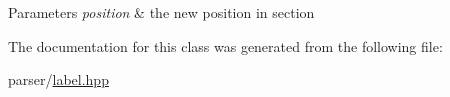 \begin{DoxyParams}{Parameters}
{\em position} & the new position in section \\
\hline
\end{DoxyParams}


The documentation for this class was generated from the following file\+:\begin{DoxyCompactItemize}
\item 
parser/\hyperlink{label_8hpp}{label.\+hpp}\end{DoxyCompactItemize}
